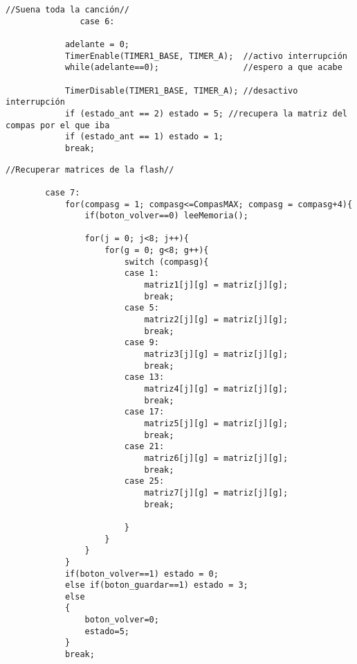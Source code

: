 \documentclass[12pt,a4paper]{article}
\begin{document}
\begin{lstlisting}[basicstyle=\footnotesize] 
            //Suena toda la canción//
               case 6:

            adelante = 0;
            TimerEnable(TIMER1_BASE, TIMER_A);  //activo interrupción
            while(adelante==0);                 //espero a que acabe

            TimerDisable(TIMER1_BASE, TIMER_A); //desactivo interrupción
            if (estado_ant == 2) estado = 5; //recupera la matriz del compas por el que iba
            if (estado_ant == 1) estado = 1;
            break;
\end{lstlisting}

\begin{lstlisting}[basicstyle=\footnotesize] 
            //Recuperar matrices de la flash//

        case 7:
            for(compasg = 1; compasg<=CompasMAX; compasg = compasg+4){
                if(boton_volver==0) leeMemoria();

                for(j = 0; j<8; j++){
                    for(g = 0; g<8; g++){
                        switch (compasg){
                        case 1:
                            matriz1[j][g] = matriz[j][g];
                            break;
                        case 5:
                            matriz2[j][g] = matriz[j][g];
                            break;
                        case 9:
                            matriz3[j][g] = matriz[j][g];
                            break;
                        case 13:
                            matriz4[j][g] = matriz[j][g];
                            break;
                        case 17:
                            matriz5[j][g] = matriz[j][g];
                            break;
                        case 21:
                            matriz6[j][g] = matriz[j][g];
                            break;
                        case 25:
                            matriz7[j][g] = matriz[j][g];
                            break;

                        }
                    }
                }
            }
            if(boton_volver==1) estado = 0;
            else if(boton_guardar==1) estado = 3;
            else
            {
                boton_volver=0;
                estado=5;
            }
            break;
\end{lstlisting}
\end{document}
